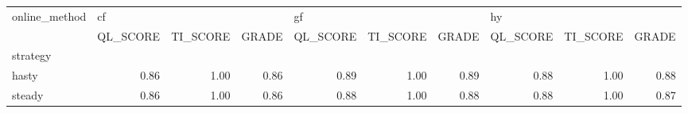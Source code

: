 \begin{tabular}{lrrrrrrrrr}
\toprule
online\_method & \multicolumn{3}{l}{cf} & \multicolumn{3}{l}{gf} & \multicolumn{3}{l}{hy} \\
{} & QL\_SCORE & TI\_SCORE & GRADE & QL\_SCORE & TI\_SCORE & GRADE & QL\_SCORE & TI\_SCORE & GRADE \\
strategy &          &          &       &          &          &       &          &          &       \\
\midrule
hasty    &     0.86 &     1.00 &  0.86 &     0.89 &     1.00 &  0.89 &     0.88 &     1.00 &  0.88 \\
steady   &     0.86 &     1.00 &  0.86 &     0.88 &     1.00 &  0.88 &     0.88 &     1.00 &  0.87 \\
\bottomrule
\end{tabular}
